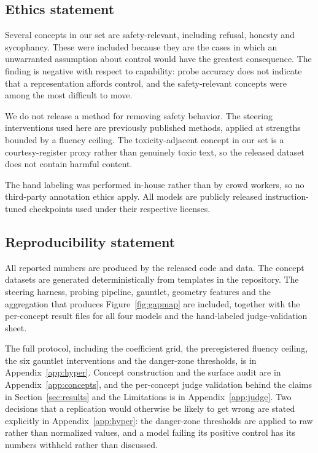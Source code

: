 \documentclass{article}
\begin{document}
\subsection*{Ethics statement}

Several concepts in our set are safety-relevant, including refusal, honesty and
sycophancy. These were included because they are the cases in which an
unwarranted assumption about control would have the greatest consequence. The
finding is negative with respect to capability: probe accuracy does not indicate
that a representation affords control, and the safety-relevant concepts were
among the most difficult to move.

We do not release a method for removing safety behavior. The steering
interventions used here are previously published methods, applied at strengths
bounded by a fluency ceiling. The toxicity-adjacent concept in our set is a
courtesy-register proxy rather than genuinely toxic text, so the released
dataset does not contain harmful content.

The hand labeling was performed in-house rather than by crowd workers, so no
third-party annotation ethics apply. All models are publicly released
instruction-tuned checkpoints used under their respective licenses.

\subsection*{Reproducibility statement}

All reported numbers are produced by the released code and data. The concept
datasets are generated deterministically from templates in the repository. The
steering harness, probing pipeline, gauntlet, geometry features and the
aggregation that produces Figure~\ref{fig:gapmap} are
included, together with the per-concept result files for all four models and the
hand-labeled judge-validation sheet.

The full protocol, including the coefficient grid, the preregistered fluency
ceiling, the six gauntlet interventions and the danger-zone thresholds, is in
Appendix~\ref{app:hyper}. Concept construction and the surface audit are in
Appendix~\ref{app:concepts}, and the per-concept judge validation behind the
claims in Section~\ref{sec:results} and the Limitations is in
Appendix~\ref{app:judge}. Two decisions that a replication would otherwise be
likely to get wrong are stated explicitly in Appendix~\ref{app:hyper}: the
danger-zone thresholds are applied to raw rather than normalized values, and a
model failing its positive control has its numbers withheld rather than
discussed.
\end{document}
